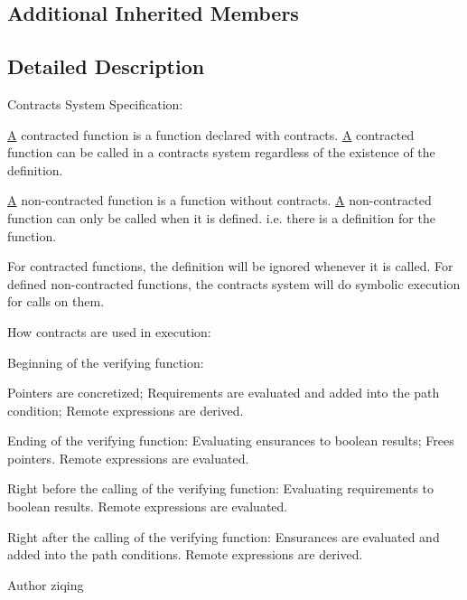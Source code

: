 \subsection*{Additional Inherited Members}


\subsection{Detailed Description}
Contracts System Specification\+:~\newline
 

\hyperlink{structA}{A} contracted function is a function declared with contracts. \hyperlink{structA}{A} contracted function can be called in a contracts system regardless of the existence of the definition.

\hyperlink{structA}{A} non-\/contracted function is a function without contracts. \hyperlink{structA}{A} non-\/contracted function can only be called when it is defined. i.\+e. there is a definition for the function.

For contracted functions, the definition will be ignored whenever it is called. For defined non-\/contracted functions, the contracts system will do symbolic execution for calls on them. 

How contracts are used in execution\+: 
\begin{DoxyEnumerate}
\item Beginning of the verifying function\+: 

Pointers are concretized; Requirements are evaluated and added into the path condition; Remote expressions are derived. 


\item 

Ending of the verifying function\+: Evaluating ensurances to boolean results; Frees pointers. Remote expressions are evaluated. 


\item 

Right before the calling of the verifying function\+: Evaluating requirements to boolean results. Remote expressions are evaluated. 


\item 

Right after the calling of the verifying function\+: Ensurances are evaluated and added into the path conditions. Remote expressions are derived. 


\end{DoxyEnumerate}

\begin{DoxyAuthor}{Author}
ziqing 
\end{DoxyAuthor}


